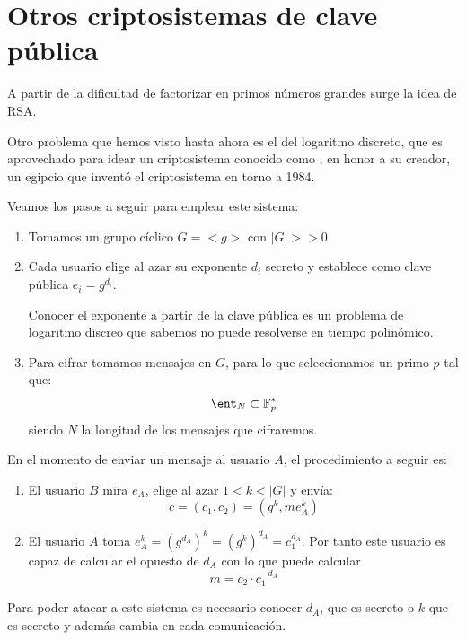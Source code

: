 \section{Otros criptosistemas de clave pública}

A partir de la dificultad de factorizar en primos números grandes surge la idea de RSA.

Otro problema que hemos visto hasta ahora es el del logaritmo discreto, que es aprovechado para idear un criptosistema conocido como , en honor a su creador, un egipcio que inventó el criptosistema en torno a 1984.

Veamos los pasos a seguir para emplear este sistema:
\begin{enumerate}
\item Tomamos un grupo cíclico $G=<g>$ con $|G| >> 0$

\item Cada usuario elige al azar su exponente $d_i$ secreto y establece como clave pública $e_i=g^{d_i}$.

Conocer el exponente a partir de la clave pública es un problema de logaritmo discreo que sabemos no puede resolverse en tiempo polinómico.

\item Para cifrar tomamos mensajes en $G$, para lo que seleccionamos un primo $p$ tal que:
\[\ent_N \subset \mathbb{F}_p^*\]
siendo $N$ la longitud de los mensajes que cifraremos.
\end{enumerate}

En el momento de enviar un mensaje al usuario $A$, el procedimiento a seguir es:
\begin{enumerate}
\item El usuario $B$ mira $e_A$, elige al azar $1<k<|G|$ y envía:
\[c=(c_1,c_2)=(g^k,me_A^k)\]

\item El usuario $A$ toma $e_A^k = (g^{d_A})^k = (g^k)^{d_A}=c_1^{d_A}$. Por tanto este usuario es capaz de calcular el opuesto de $d_A$ con lo que puede calcular
\[m = c_2\cdot c_1^{-d_A}\]
\end{enumerate}

Para poder atacar a este sistema es necesario conocer $d_A$, que es secreto o $k$ que es secreto y además cambia en cada comunicación.